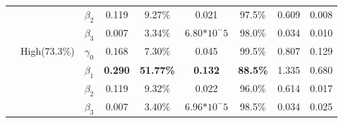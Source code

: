 \documentclass{svjour3}                     %
\begin{document}
\begin{table}[p]
\begin{tabular}{c|c|c|cccccc}
		&& $\beta_2$ & 0.119 & 9.27\% & 0.021 & 97.5\% & 0.609 & 0.008 \\
		&& $\beta_3$ & 0.007 & 3.34\% & 6.80$*10^-5$ & 98.0\% & 0.034 & 0.010 \\ \cline{2-9} \noalign{\smallskip}
		& \multirow{4}{*}{High(73.3\%)}
		& $\gamma_0$ & 0.168 & 7.30\% & 0.045 & 99.5\% & 0.807 & 0.129 \\
		&& $\beta_1$ & \textbf{0.290} & \textbf{51.77\%} & \textbf{0.132} & \textbf{88.5\%} & 1.335 & 0.680 \\
		&& $\beta_2$ & 0.119 & 9.32\% & 0.022 & 96.0\% & 0.614 & 0.017 \\
		&& $\beta_3$ & 0.007 & 3.40\% & 6.96$*10^-5$ & 98.5\% & 0.034 & 0.025 \\
		\bottomrule
	\end{tabular}
\end{table}
\end{document}
